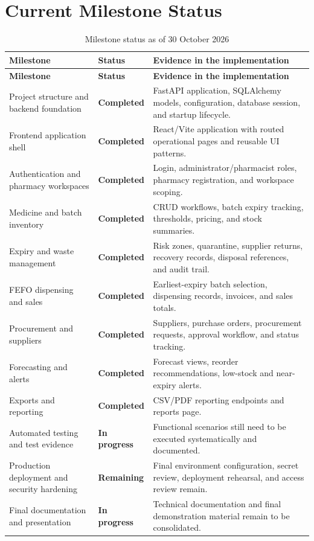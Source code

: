 \documentclass[12pt,a4paper]{article}
\newcommand{\statusdone}{\textcolor{green!45!black}{\textbf{Completed}}}
\newcommand{\statusprogress}{\textcolor{orange!75!black}{\textbf{In progress}}}
\newcommand{\statusremaining}{\textcolor{red!70!black}{\textbf{Remaining}}}
\begin{document}
\section{Current Milestone Status}
\begin{longtable}{p{}p{}p{}}
\caption{Milestone status as of 30 October 2026}\\
\toprule
\textbf{Milestone} & \textbf{Status} & \textbf{Evidence in the implementation} \\
\midrule
\endfirsthead
\toprule
\textbf{Milestone} & \textbf{Status} & \textbf{Evidence in the implementation} \\
\midrule
\endhead
Project structure and backend foundation & \statusdone & FastAPI application, SQLAlchemy models, configuration, database session, and startup lifecycle. \\
Frontend application shell & \statusdone & React/Vite application with routed operational pages and reusable UI patterns. \\
Authentication and pharmacy workspaces & \statusdone & Login, administrator/pharmacist roles, pharmacy registration, and workspace scoping. \\
Medicine and batch inventory & \statusdone & CRUD workflows, batch expiry tracking, thresholds, pricing, and stock summaries. \\
Expiry and waste management & \statusdone & Risk zones, quarantine, supplier returns, recovery records, disposal references, and audit trail. \\
FEFO dispensing and sales & \statusdone & Earliest-expiry batch selection, dispensing records, invoices, and sales totals. \\
Procurement and suppliers & \statusdone & Suppliers, purchase orders, procurement requests, approval workflow, and status tracking. \\
Forecasting and alerts & \statusdone & Forecast views, reorder recommendations, low-stock and near-expiry alerts. \\
Exports and reporting & \statusdone & CSV/PDF reporting endpoints and reports page. \\
Automated testing and test evidence & \statusprogress & Functional scenarios still need to be executed systematically and documented. \\
Production deployment and security hardening & \statusremaining & Final environment configuration, secret review, deployment rehearsal, and access review remain. \\
Final documentation and presentation & \statusprogress & Technical documentation and final demonstration material remain to be consolidated. \\
\bottomrule
\end{longtable}
\end{document}

